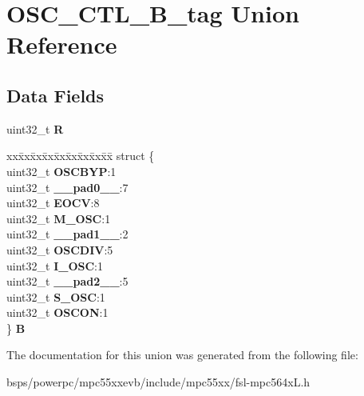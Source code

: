 \hypertarget{unionOSC__CTL__32B__tag}{}\section{O\+S\+C\+\_\+\+C\+T\+L\+\_\+B\+\_\+tag Union Reference}
\label{unionOSC__CTL__32B__tag}
\subsection*{Data Fields}
\begin{DoxyCompactItemize}
\item 
\mbox{\label{unionOSC__CTL__32B__tag_af9ae090bf4455a3146685251e75e18d4}} 
uint32\+\_\+t {\bfseries R}
\item 
\mbox{\label{unionOSC__CTL__32B__tag_ab2d68a78f8b3e747c7e396cc0647643f}} 
\begin{tabbing}
xx\=xx\=xx\=xx\=xx\=xx\=xx\=xx\=xx\=\kill
struct \{\\
\>uint32\_t {\bfseries OSCBYP}:1\\
\>uint32\_t {\bfseries \_\_pad0\_\_}:7\\
\>uint32\_t {\bfseries EOCV}:8\\
\>uint32\_t {\bfseries M\_OSC}:1\\
\>uint32\_t {\bfseries \_\_pad1\_\_}:2\\
\>uint32\_t {\bfseries OSCDIV}:5\\
\>uint32\_t {\bfseries I\_OSC}:1\\
\>uint32\_t {\bfseries \_\_pad2\_\_}:5\\
\>uint32\_t {\bfseries S\_OSC}:1\\
\>uint32\_t {\bfseries OSCON}:1\\
\} {\bfseries B}\\

\end{tabbing}\end{DoxyCompactItemize}


The documentation for this union was generated from the following file\+:\begin{DoxyCompactItemize}
\item 
bsps/powerpc/mpc55xxevb/include/mpc55xx/fsl-\/mpc564x\+L.\+h\end{DoxyCompactItemize}
